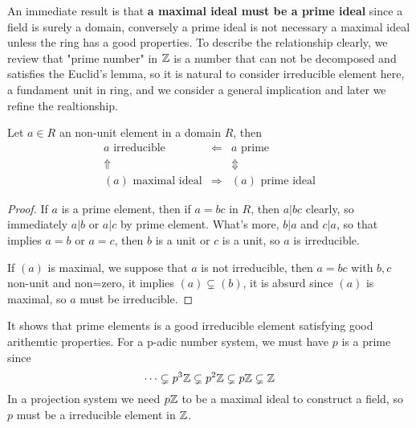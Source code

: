 \documentclass[en,geye,blue,normal,12pt]{elegantnote}
\begin{document}
An immediate result is that\textbf{ a maximal ideal must be a prime ideal} since a field is surely a domain, conversely a prime ideal is not necessary a maximal ideal unless the ring has a good properties. To describe the relationship clearly, we review that  "prime number" in \(\mathbb{Z}\) is a number that can not be decomposed and satisfies the Euclid's lemma, so it is natural to consider irreducible element here, a fundament unit in ring, and we consider a general implication and later we refine the realtionship.

\begin{proposition} \label{general implication}
  Let \(a \in R\) an non-unit element in a domain \(R\), then
\[
\begin{array}{ccc}
a \text{ irreducible} & \Leftarrow & a \text{ prime} \\
\Uparrow  &  & \Updownarrow \\
(a) \text{ maximal ideal} & \Rightarrow & (a) \text{ prime ideal}
\end{array}
\]

\begin{proof}
  If \(a\) is a prime element, then if \(a = bc\) in \(R\), then \(a|bc\) clearly, so immediately \(a|b\) or \(a|c\) by prime element. What's more, \(b|a\) and \(c|a\), so that implies \(a=b\) or \(a=c\), then \(b\) is a unit or \(c\) is a unit, so \(a\) is irreducible.

  If \((a)\) is maximal, we suppose that \(a\) is not irreducible, then \(a=bc\) with \(b,c\) non-unit and non=zero, it implies \((a) \subsetneq (b)\), it is absurd since \((a)\) is maximal, so \(a\) must be irreducible.
\end{proof}
\end{proposition}

\begin{remark}
  It shows that prime elements is a good irreducible element satisfying good arithemtic properties. For a p-adic number system, we must have \(p\) is a prime since
  \[\cdots \subsetneq p^3 \mathbb{Z}\subsetneq p^2 \mathbb{Z} \subsetneq p \mathbb{Z} \subsetneq \mathbb{Z}\]
  In a projection system we need \(p\mathbb{Z}\) to be a maximal ideal to construct a field, so \(p\) must be a irreducible element in \(\mathbb{Z}\).
\end{remark}
\end{document}
